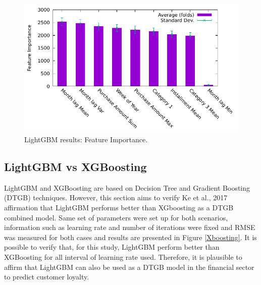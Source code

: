 \documentclass[letterpaper, 10 pt, conference]{ieeeconf}  %
\begin{document}
\begin{figure}[thpb]
\centering
\includegraphics[scale=0.7]{Figures/Feature.pdf}
\caption{LightGBM results: Feature Importance.}
\label{feature_importance}
\end{figure}

\subsection{LightGBM vs XGBoosting}
LightGBM and XGBoosting are based on Decision Tree and Gradient Boosting (DTGB) techniques. However, this section aims to verify Ke et al., 2017 \cite{LGBM} affirmation that LightGBM performs better than XGboosting as a DTGB combined model. Same set of parameters were set up for both scenarios, information such as learning rate and number of iterations were fixed and RMSE was measured for both cases and results are presented in Figure \ref{Xboosting}. It is possible to verify that, for this study, LightGBM perform better than XGBoosting for all interval of learning rate used. Therefore, it is plausible to affirm that LightGBM can also be used as a DTGB model in the financial sector to predict customer loyalty.
\end{document}
